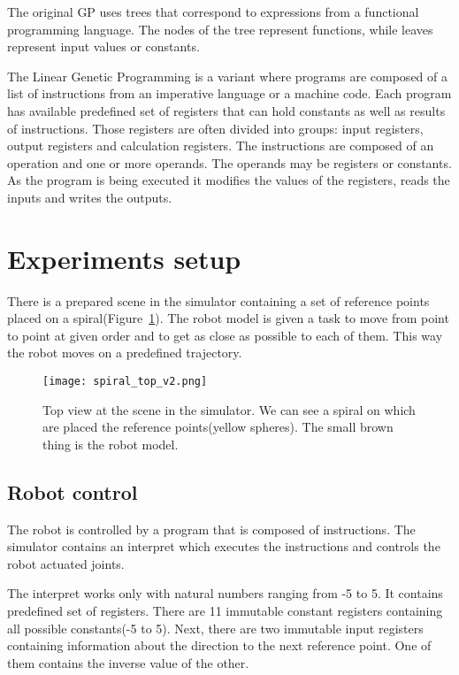 \documentclass{ExcelAtFIT}
\begin{document}
The original GP uses trees that correspond to expressions from a functional programming language.
The nodes of the tree represent functions, while leaves represent input values or constants.

The Linear Genetic Programming is a variant where programs are composed of a list of instructions from an imperative language or a machine code.
Each program has available predefined set of registers that can hold constants as well as results of instructions.
Those registers are often divided into groups: input registers, output registers and calculation registers.
The instructions are composed of an operation and one or more operands.
The operands may be registers or constants.
As the program is being executed it modifies the values of the registers, reads the inputs and writes the outputs.


\section{Experiments setup}
\label{sec:ExperimentsSetup}
There is a prepared scene in the simulator containing a set of reference points placed on a spiral(Figure~\ref{fig:SpiralTop}).
The robot model is given a task to move from point to point at given order and to get as close as possible to each of them.
This way the robot moves on a predefined trajectory.

\begin{figure}[t]
\centering
{\texttt{[image: spiral\_top\_v2.png]}}
\caption{Top view at the scene in the simulator.
We can see a spiral on which are placed the reference points(yellow spheres).
The small brown thing is the robot model.}
\label{fig:SpiralTop}
\end{figure}


\subsection{Robot control}
The robot is controlled by a program that is composed of instructions.
The simulator contains an interpret which executes the instructions and controls the robot actuated joints.

The interpret works only with natural numbers ranging from -5 to 5.
It contains predefined set of registers.
There are 11 immutable constant registers containing all possible constants(-5 to 5).
Next, there are two immutable input registers containing information about the direction to the next reference point.
One of them contains the inverse value of the other.
\end{document}

